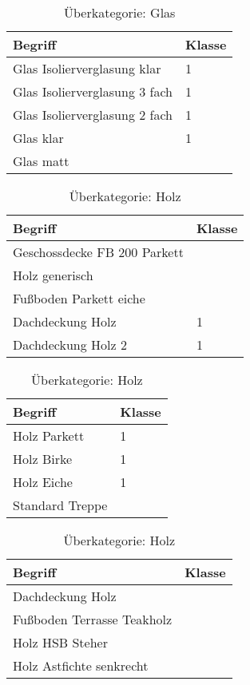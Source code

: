\begin{table}[h]
	\label{t:evaluation-example16}
	\centering
	\begin{tabular}{|p{}|p{}|}
		\hline
		\textbf{Begriff} & \textbf{Klasse} \\ \hline
		 Glas Isolierverglasung klar & 1 \\ \hline
		Glas Isolierverglasung 3 fach & 1 \\ \hline
		Glas Isolierverglasung 2 fach & 1 \\ \hline
		Glas klar & 1 \\ \hline
		Glas matt & ~ \\ \hline
	\end{tabular}
	\caption{Überkategorie: Glas}
\end{table}

\begin{table}[h]
	\label{t:evaluation-example17}
	\centering
	\begin{tabular}{|p{}|p{}|}
		\hline
		\textbf{Begriff} & \textbf{Klasse} \\ \hline
		 Geschossdecke FB 200 Parkett & ~ \\ \hline
		Holz generisch & ~ \\ \hline
		Fußboden Parkett eiche & ~ \\ \hline
		Dachdeckung Holz & 1 \\ \hline
		Dachdeckung Holz 2 & 1 \\ \hline
	\end{tabular}
	\caption{Überkategorie: Holz}
\end{table}

\begin{table}[h]
	\label{t:evaluation-example18}
	\centering
	\begin{tabular}{|p{}|p{}|}
		\hline
		\textbf{Begriff} & \textbf{Klasse} \\ \hline
		 Holz Parkett & 1 \\ \hline
		Holz Birke & 1 \\ \hline
		Holz Eiche & 1 \\ \hline
		Standard Treppe & ~ \\ \hline
	\end{tabular}
	\caption{Überkategorie: Holz}
\end{table}

\begin{table}[h]
	\label{t:evaluation-example19}
	\centering
	\begin{tabular}{|p{}|p{}|}
		\hline
		\textbf{Begriff} & \textbf{Klasse} \\ \hline
		Dachdeckung Holz & ~ \\ \hline
		Fußboden Terrasse Teakholz & ~ \\ \hline
		Holz HSB Steher & ~ \\ \hline
		Holz Astfichte senkrecht & ~ \\ \hline
	\end{tabular}
	\caption{Überkategorie: Holz}
\end{table}

